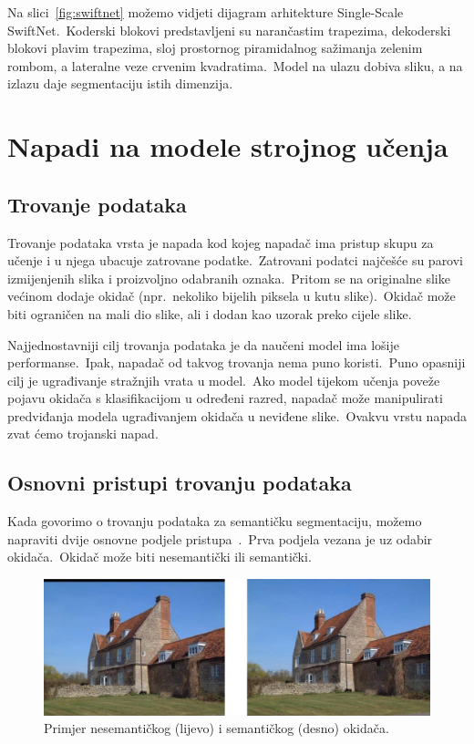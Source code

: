 \documentclass[times, utf8, seminar, numeric]{fer}
\begin{document}
Na slici~\ref{fig:swiftnet} možemo vidjeti dijagram arhitekture Single-Scale SwiftNet.\ 
Koderski blokovi predstavljeni su narančastim trapezima, dekoderski blokovi plavim trapezima, sloj prostornog piramidalnog sažimanja zelenim rombom, a lateralne veze crvenim kvadratima.\ 
Model na ulazu dobiva sliku, a na izlazu daje segmentaciju istih dimenzija.\

\chapter{Napadi na modele strojnog učenja}

\section{Trovanje podataka}

Trovanje podataka vrsta je napada kod kojeg napadač ima pristup skupu za učenje i u njega ubacuje zatrovane podatke.\
Zatrovani podatci najčešće su parovi izmijenjenih slika i proizvoljno odabranih oznaka.\ 
Pritom se na originalne slike većinom dodaje okidač (npr.\ nekoliko bijelih piksela u kutu slike).\ 
Okidač može biti ograničen na mali dio slike, ali i dodan kao uzorak preko cijele slike.\
  
Najjednostavniji cilj trovanja podataka je da naučeni model ima lošije performanse.\ Ipak, napadač od takvog trovanja nema puno koristi.\
Puno opasniji cilj je ugrađivanje stražnjih vrata u model.\ 
Ako model tijekom učenja poveže pojavu okidača s klasifikacijom u određeni razred, napadač može manipulirati predviđanja modela ugrađivanjem okidača u neviđene slike.\
Ovakvu vrstu napada zvat ćemo trojanski napad.\

\section{Osnovni pristupi trovanju podataka}

Kada govorimo o trovanju podataka za semantičku segmentaciju, možemo napraviti dvije osnovne podjele pristupa~\cite{li2021hidden}.\ 
Prva podjela vezana je uz odabir okidača.\ Okidač može biti nesemantički ili semantički.\ 

\begin{figure}[htb]
    \centering
    \includegraphics[scale=0.4]{./Slike/nonsemantic_semantic.png}
    \caption{Primjer nesemantičkog (lijevo) i semantičkog (desno) okidača.}
    \label{fig:nonsemantic_semantic}
\end{figure}
\end{document}
